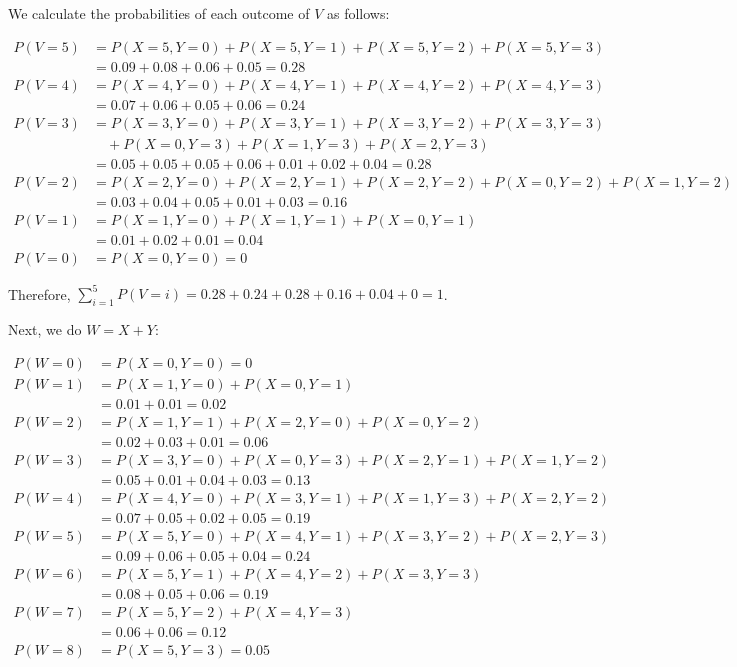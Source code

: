 \documentclass[10pt, oneside]{article}   	%
\theoremstyle{definition}
\begin{document}
\begin{enumerate}[label=6.\arabic*]
We calculate the probabilities of each outcome of $V$ as follows:

\begin{align*}
P(V = 5) &= P(X = 5, Y = 0) + P(X = 5, Y = 1) + P(X = 5, Y = 2) + P(X = 5, Y = 3) \\
&= 0.09 + 0.08 + 0.06 + 0.05 = \boxed{0.28} \\
P(V = 4) &= P(X = 4, Y = 0) + P(X = 4, Y = 1) + P(X = 4, Y = 2) + P(X = 4, Y = 3) \\
&= 0.07 + 0.06 + 0.05 + 0.06 = \boxed{0.24} \\
P(V = 3) &= P(X = 3, Y = 0) + P(X = 3, Y = 1) + P(X = 3, Y = 2) + P(X = 3, Y = 3) \\
&\quad + P(X = 0, Y = 3) + P(X = 1, Y = 3) + P(X = 2, Y = 3) \\
&= 0.05 + 0.05 + 0.05 + 0.06 + 0.01 + 0.02 + 0.04 = \boxed{0.28} \\
P(V = 2) &= P(X = 2, Y = 0) + P(X = 2, Y = 1) + P(X = 2, Y = 2) + P(X = 0, Y = 2) + P(X = 1, Y = 2) \\
&= 0.03 + 0.04 + 0.05 + 0.01 + 0.03 = \boxed{0.16} \\
P(V = 1) &= P(X = 1, Y = 0) + P(X = 1, Y = 1) + P(X = 0, Y = 1) \\
&= 0.01 + 0.02 + 0.01 = \boxed{0.04} \\
P(V = 0) &= P(X = 0, Y = 0) = \boxed{0}
\end{align*}

Therefore, $\sum^5_{i=1} P(V = i) = 0.28 + 0.24 + 0.28 + 0.16 + 0.04 + 0 = \boxed{1}$.

Next, we do $W = X + Y$:

\begin{align*}
P(W = 0) &= P(X = 0, Y = 0) = \boxed{0} \\
P(W = 1) &= P(X = 1, Y = 0) + P(X = 0, Y = 1) \\
&= 0.01 + 0.01 = \boxed{0.02} \\
P(W = 2) &= P(X = 1, Y = 1) + P(X = 2, Y = 0) + P(X = 0, Y = 2) \\
&= 0.02 + 0.03 + 0.01 = \boxed{0.06} \\
P(W = 3) &= P(X = 3, Y = 0) + P(X = 0, Y = 3) + P(X = 2, Y = 1) + P(X = 1, Y = 2) \\
&= 0.05 + 0.01 + 0.04 + 0.03 = \boxed{0.13} \\
P(W = 4) &= P(X = 4, Y = 0) + P(X = 3, Y = 1) + P(X = 1, Y = 3) + P(X = 2, Y = 2) \\
&= 0.07 + 0.05 + 0.02 + 0.05 = \boxed{0.19} \\
P(W = 5) &= P(X = 5, Y = 0) + P(X = 4, Y = 1) + P(X = 3, Y = 2) + P(X = 2, Y = 3) \\
&= 0.09 + 0.06 + 0.05 + 0.04 = \boxed{0.24} \\
P(W = 6) &= P(X = 5, Y = 1) + P(X = 4, Y = 2) + P(X = 3, Y = 3) \\
&= 0.08 + 0.05 + 0.06 = \boxed{0.19} \\
P(W = 7) &= P(X = 5, Y = 2) + P(X = 4, Y = 3) \\
&= 0.06 + 0.06 = \boxed{0.12} \\
P(W = 8) &= P(X = 5, Y = 3) = \boxed{0.05}
\end{align*}


\end{enumerate}
\end{document}
